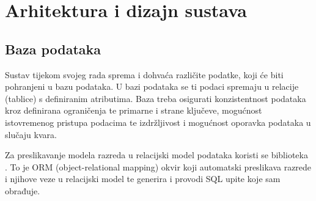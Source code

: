 \chapter{Arhitektura i dizajn sustava}
		
%

	
	
		

		

				
		\section{Baza podataka}
			
%			

		Sustav tijekom svojeg rada sprema i dohvaća različite podatke, koji će biti pohranjeni u bazu podataka. U bazi podataka se ti podaci spremaju u relacije (tablice) s definiranim atributima. Baza treba osigurati konzistentnost podataka kroz definirana ograničenja te primarne i strane ključeve, mogućnost istovremenog pristupa podacima te izdržljivost i mogućnost oporavka podataka u slučaju kvara.
		
		Za preslikavanje modela razreda u relacijski model podataka koristi se biblioteka . To je ORM (object-relational mapping) okvir koji automatski preslikava razrede i njihove veze u relacijski model te generira i provodi SQL upite koje sam obrađuje.
		
